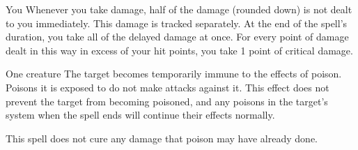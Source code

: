 \begin{spellheader}
    \spelldur{\durmed}
\end{spellheader}
\begin{spelleffects}
    \begin{spelltarget}{You}
        \spelleffect Whenever you take damage, half of the damage (rounded down) is not dealt to you immediately. This damage is tracked separately. At the end of the spell's duration, you take all of the delayed damage at once. For every point of damage dealt in this way in excess of your hit points, you take 1 point of critical damage.
    \end{spelltarget}
\end{spelleffects}
\begin{spellfooter}
    
\end{spellfooter}

\begin{spellheader}
    \spellrng{\rngclose}
    \spelldur{\durshort}
\end{spellheader}
\begin{spelleffects}
    \begin{spelltarget}{One creature}
        \spelleffect The target becomes temporarily immune to the effects of poison. Poisons it is exposed to do not make attacks against it. This effect does not prevent the target from becoming poisoned, and any poisons in the target's system when the spell ends will continue their effects normally. 
    \end{spelltarget}
\end{spelleffects}
\begin{spellfooter}
    \spellnotes This spell does not cure any damage that poison may have already done.
\end{spellfooter}

